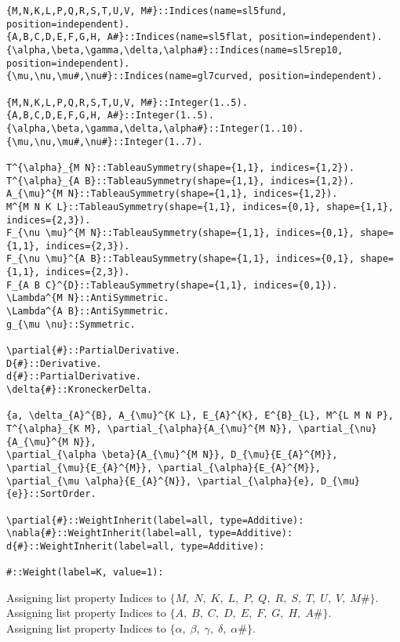 \documentclass[11pt]{article}
\begin{document}
{\color[named]{Blue}\begin{verbatim}
{M,N,K,L,P,Q,R,S,T,U,V, M#}::Indices(name=sl5fund, position=independent).
{A,B,C,D,E,F,G,H, A#}::Indices(name=sl5flat, position=independent).
{\alpha,\beta,\gamma,\delta,\alpha#}::Indices(name=sl5rep10, position=independent).
{\mu,\nu,\mu#,\nu#}::Indices(name=gl7curved, position=independent).

{M,N,K,L,P,Q,R,S,T,U,V, M#}::Integer(1..5).
{A,B,C,D,E,F,G,H, A#}::Integer(1..5).
{\alpha,\beta,\gamma,\delta,\alpha#}::Integer(1..10).
{\mu,\nu,\mu#,\nu#}::Integer(1..7).

T^{\alpha}_{M N}::TableauSymmetry(shape={1,1}, indices={1,2}).
T^{\alpha}_{A B}::TableauSymmetry(shape={1,1}, indices={1,2}).
A_{\mu}^{M N}::TableauSymmetry(shape={1,1}, indices={1,2}).
M^{M N K L}::TableauSymmetry(shape={1,1}, indices={0,1}, shape={1,1}, indices={2,3}).
F_{\nu \mu}^{M N}::TableauSymmetry(shape={1,1}, indices={0,1}, shape={1,1}, indices={2,3}).
F_{\nu \mu}^{A B}::TableauSymmetry(shape={1,1}, indices={0,1}, shape={1,1}, indices={2,3}).
F_{A B C}^{D}::TableauSymmetry(shape={1,1}, indices={0,1}).
\Lambda^{M N}::AntiSymmetric.
\Lambda^{A B}::AntiSymmetric.
g_{\mu \nu}::Symmetric.

\partial{#}::PartialDerivative.
D{#}::Derivative.
d{#}::PartialDerivative.
\delta{#}::KroneckerDelta.

{a, \delta_{A}^{B}, A_{\mu}^{K L}, E_{A}^{K}, E^{B}_{L}, M^{L M N P}, T^{\alpha}_{K M}, \partial_{\alpha}{A_{\mu}^{M N}}, \partial_{\nu}{A_{\mu}^{M N}}, 
\partial_{\alpha \beta}{A_{\mu}^{M N}}, D_{\mu}{E_{A}^{M}}, \partial_{\mu}{E_{A}^{M}}, \partial_{\alpha}{E_{A}^{M}},
\partial_{\mu \alpha}{E_{A}^{N}}, \partial_{\alpha}{e}, D_{\mu}{e}}::SortOrder.

\partial{#}::WeightInherit(label=all, type=Additive):
\nabla{#}::WeightInherit(label=all, type=Additive):
d{#}::WeightInherit(label=all, type=Additive):

#::Weight(label=K, value=1):
\end{verbatim}}
Assigning list property Indices to $\{M,\; N,\; K,\; L,\; P,\; Q,\; R,\; S,\; T,\; U,\; V,\; M\#\}$.
\\
Assigning list property Indices to $\{A,\; B,\; C,\; D,\; E,\; F,\; G,\; H,\; A\#\}$.
\\
Assigning list property Indices to $\{\alpha,\; \beta,\; \gamma,\; \delta,\; \alpha\#\}$.
\\
\end{document}
